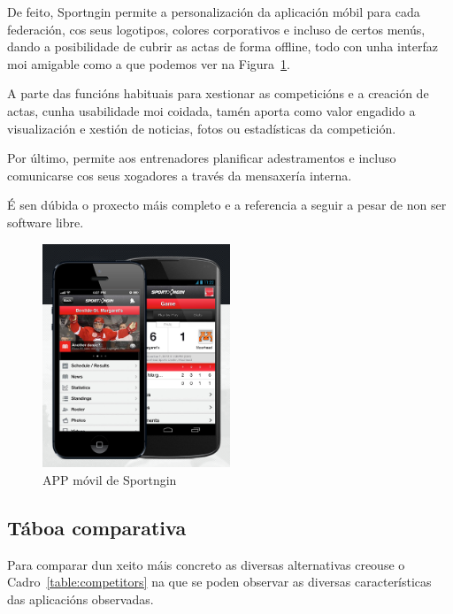     De feito, Sportngin permite a personalización da aplicación móbil para 
cada federación, cos seus logotipos, colores corporativos e incluso de certos 
menús, dando a posibilidade de cubrir as actas de forma offline, todo con unha 
interfaz moi amigable como a que podemos ver na Figura~\ref{fig:img:sportngin}.

    A parte das funcións habituais para xestionar as competicións e a creación 
de actas, cunha usabilidade moi coidada, tamén aporta como valor engadido a 
visualización e xestión de noticias, fotos ou estadísticas da competición.

    Por último, permite aos entrenadores planificar adestramentos e incluso 
comunicarse cos seus xogadores a través da mensaxería interna.

    É sen dúbida o proxecto máis completo e a referencia a seguir a pesar de 
non ser software libre.

    \begin{figure}[h!]
      \begin{center}
	\includegraphics[width=0.5\textwidth]{./img/sportngin-app.png}
	\caption{APP móvil de Sportngin}
	\label{fig:img:sportngin}
      \end{center}
    \end{figure}

    \clearpage

    \subsection{Táboa comparativa}

    Para comparar dun xeito máis concreto as diversas alternativas creouse o 
Cadro~\ref{table:competitors} na que se poden observar as diversas 
características das aplicacións observadas.

